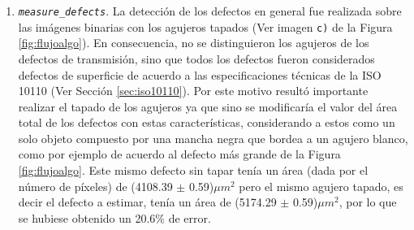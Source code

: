 \begin{enumerate}
\item \texttt{\textit{measure\_defects}}. La detección de los defectos en general fue realizada sobre las imágenes binarias con los agujeros tapados (Ver imagen \texttt{c)} de la Figura \ref{fig:flujoalgo}). En consecuencia, no se distinguieron los agujeros de los defectos de transmisión, sino que todos los defectos fueron considerados defectos de superficie de acuerdo a las especificaciones técnicas de la ISO 10110 (Ver Sección \ref{sec:iso10110}). Por este motivo resultó importante realizar el tapado de los agujeros ya que sino se modificaría el valor del área total de los defectos con estas características, considerando a estos como un solo objeto compuesto por una mancha negra que bordea a un agujero blanco, como por ejemplo de acuerdo al defecto más grande de la Figura \ref{fig:flujoalgo}. Este mismo defecto sin tapar tenía un área (dada por el número de píxeles) de (4108.39 $\pm$ 0.59)$\mu m^{2}$ pero el mismo agujero tapado, es decir el defecto a estimar, tenía un área de (5174.29 $\pm$ 0.59)$\mu m^{2}$, por lo que se hubiese obtenido un 20.6\% de error.


\end{enumerate}
